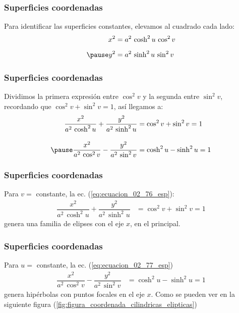 \documentclass[12pt]{beamer}
\begin{document}
\begin{frame}
\frametitle{Superficies coordenadas}
Para identificar las superficies constantes, elevamos al cuadrado cada lado:
\pause
\begin{eqnarray*}
\begin{aligned}
x^{2} &= a^{2} \, \cosh^{2} u \, \cos^{2} v \label{eq:ecuacion_02_74_esp} \\[0.5em] \pause
y^{2} &= a^{2} \, \sinh^{2} u \, \sin^{2} v \label{eq:ecuacion_02_75_esp}
\end{aligned}
\end{eqnarray*}
\end{frame}
\begin{frame}
\frametitle{Superficies coordenadas}
Dividimos la primera expresión entre $\cos^{2} v$ \pause y la segunda entre $\sin^{2} v$, recordando que $\cos^{2} v + \sin^{2} v = 1$, así llegamos a:
\pause
\begin{eqnarray}
\begin{aligned}
\dfrac{x^{2}}{a^{2} \, \cosh^{2} u} + \dfrac{y^{2}}{a^{2} \, \sinh^{2} u} &= \cos^{2} v + \sin^{2} v = 1 \label{eq:ecuacion_02_76_esp}\\[1em] \pause
\dfrac{x^{2}}{a^{2} \, \cos^{2} v} - \dfrac{y^{2}}{a^{2} \, \sin^{2} v } &= \cosh^{2} u - \sinh^{2} u = 1 \label{eq:ecuacion_02_77_esp}
\end{aligned}
\end{eqnarray}
\end{frame}
\begin{frame}
\frametitle{Superficies coordenadas}
Para $v = $ constante, la ec. (\ref{eq:ecuacion_02_76_esp}):
\begin{align*}
\dfrac{x^{2}}{a^{2} \, \cosh^{2} u} + \dfrac{y^{2}}{a^{2} \, \sinh^{2} u} &= \cos^{2} v + \sin^{2} v = 1 
\end{align*}
genera una familia de elipses con el eje $x$, en el principal.
\end{frame}
\begin{frame}
\frametitle{Superficies coordenadas}
Para $u = $ constante, la ec. (\ref{eq:ecuacion_02_77_esp})
\begin{align*}
\dfrac{x^{2}}{a^{2} \, \cos^{2} v} - \dfrac{y^{2}}{a^{2} \, \sin^{2} v } &= \cosh^{2} u - \sinh^{2} u = 1
\end{align*}
genera hipérbolas con puntos focales en el eje $x$. \pause Como se pueden ver en la siguiente figura (\ref{fig:figura_coordenada_cilindricas_elipticas})
\end{frame}
\end{document}
